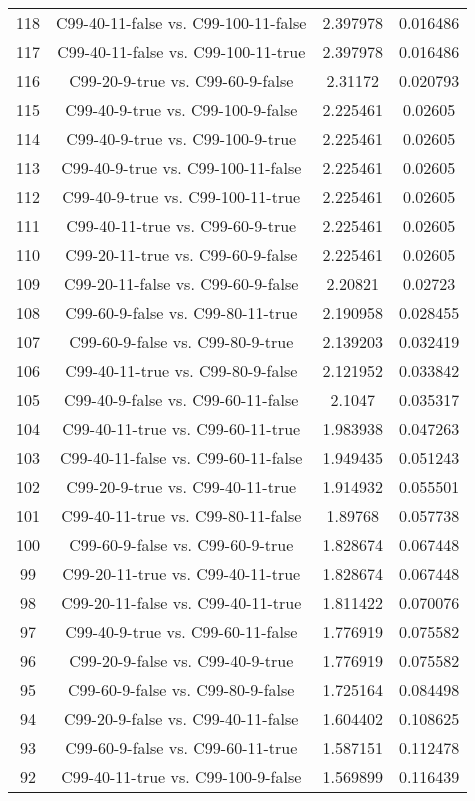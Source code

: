 \documentclass[a4paper,10pt]{article}
\begin{document}
\begin{landscape}
\begin{table}[!htp]
\begin{tabular}{cccc}
118&C99-40-11-false vs. C99-100-11-false&2.397978&0.016486\\
117&C99-40-11-false vs. C99-100-11-true&2.397978&0.016486\\
116&C99-20-9-true vs. C99-60-9-false&2.31172&0.020793\\
115&C99-40-9-true vs. C99-100-9-false&2.225461&0.02605\\
114&C99-40-9-true vs. C99-100-9-true&2.225461&0.02605\\
113&C99-40-9-true vs. C99-100-11-false&2.225461&0.02605\\
112&C99-40-9-true vs. C99-100-11-true&2.225461&0.02605\\
111&C99-40-11-true vs. C99-60-9-true&2.225461&0.02605\\
110&C99-20-11-true vs. C99-60-9-false&2.225461&0.02605\\
109&C99-20-11-false vs. C99-60-9-false&2.20821&0.02723\\
108&C99-60-9-false vs. C99-80-11-true&2.190958&0.028455\\
107&C99-60-9-false vs. C99-80-9-true&2.139203&0.032419\\
106&C99-40-11-true vs. C99-80-9-false&2.121952&0.033842\\
105&C99-40-9-false vs. C99-60-11-false&2.1047&0.035317\\
104&C99-40-11-true vs. C99-60-11-true&1.983938&0.047263\\
103&C99-40-11-false vs. C99-60-11-false&1.949435&0.051243\\
102&C99-20-9-true vs. C99-40-11-true&1.914932&0.055501\\
101&C99-40-11-true vs. C99-80-11-false&1.89768&0.057738\\
100&C99-60-9-false vs. C99-60-9-true&1.828674&0.067448\\
99&C99-20-11-true vs. C99-40-11-true&1.828674&0.067448\\
98&C99-20-11-false vs. C99-40-11-true&1.811422&0.070076\\
97&C99-40-9-true vs. C99-60-11-false&1.776919&0.075582\\
96&C99-20-9-false vs. C99-40-9-true&1.776919&0.075582\\
95&C99-60-9-false vs. C99-80-9-false&1.725164&0.084498\\
94&C99-20-9-false vs. C99-40-11-false&1.604402&0.108625\\
93&C99-60-9-false vs. C99-60-11-true&1.587151&0.112478\\
92&C99-40-11-true vs. C99-100-9-false&1.569899&0.116439\\

\end{tabular}
\end{table}
\end{landscape}
\end{document}
